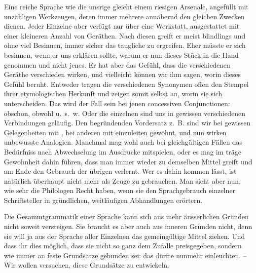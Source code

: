 Eine reiche Sprache wie die unsrige gleicht einem riesigen Arsenale, angefüllt mit unzähligen Werkzeugen, deren immer mehrere annähernd den gleichen Zwecken dienen. Jeder Einzelne aber verfügt nur über eine  Werkstatt, ausgestattet mit einer kleineren Anzahl von Geräthen. Nach diesen greift er meist blindlings und ohne viel Besinnen, immer sicher das taugliche zu ergreifen. Eher müsste er sich besinnen, wenn er uns erklären sollte, warum er nun dieses Stück in die Hand genommen und nicht jenes. Er hat aber das Gefühl, dass die verschiedenen Geräthe verschieden wirken, und vielleicht können wir ihm sagen, worin dieses Gefühl beruht. Entweder tragen die verschiedenen \label{fp.103} Synonymen offen den Stempel ihrer etymologischen Herkunft und zeigen somit selbst an, worin sie sich unterscheiden. Das wird der Fall sein bei jenen concessiven Conjunctionen: obschon, obwohl u.~s.~w. Oder die einzelnen sind uns in gewissen verschiedenen Verbindungen geläufig. Den begründenden Vordersatz z.~B. sind wir bei gewissen Gelegenheiten mit , bei anderen mit  einzuleiten gewöhnt, und nun wirken unbewusste Analogien. Manchmal mag wohl auch bei gleichgültigen Fällen das Bedürfniss nach Abwechselung im Ausdrucke mitspielen, oder es mag im  träge Gewohnheit dahin führen, dass man immer wieder zu demselben Mittel greift und am Ende den Gebrauch der übrigen verlernt. Wer es dahin kommen lässt, ist natürlich überhaupt nicht mehr als Zeuge zu gebrauchen. Man sieht aber nun, wie sehr die Philologen Recht haben, wenn sie den Sprachgebrauch einzelner Schriftsteller in gründlichen, weitläufigen Abhandlungen erörtern.

Die Gesammtgrammatik einer Sprache kann sich aus mehr äusserlichen Gründen nicht soweit versteigen. Sie braucht es aber auch aus inneren Gründen nicht, denn sie will ja aus der Sprache aller Einzelnen das gemeingültige Mittel ziehen. Und dass ihr dies möglich, dass sie nicht so ganz dem Zufalle preisgegeben, sondern wie immer an feste Grundsätze gebunden sei: das dürfte nunmehr einleuchten. – Wir wollen versuchen, diese Grundsätze zu entwickeln.

